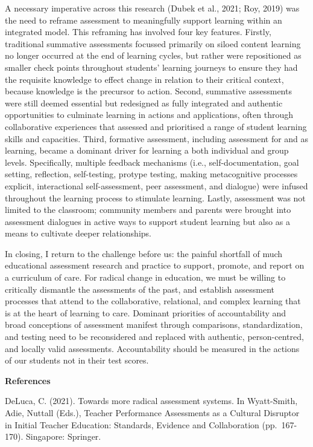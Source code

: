 \documentclass[
]{book}
\begin{document}
A necessary imperative across this research (Dubek et al., 2021; Roy, 2019) was the need to reframe assessment to meaningfully support learning within an integrated model. This reframing has involved four key features. Firstly, traditional summative assessments focussed primarily on siloed content learning no longer occurred at the end of learning cycles, but rather were repositioned as smaller check points throughout students' learning journeys to ensure they had the requisite knowledge to effect change in relation to their critical context, because knowledge is the precursor to action. Second, summative assessments were still deemed essential but redesigned as fully integrated and authentic opportunities to culminate learning in actions and applications, often through collaborative experiences that assessed and prioritised a range of student learning skills and capacities. Third, formative assessment, including assessment for and as learning, became a dominant driver for learning a both individual and group levels. Specifically, multiple feedback mechanisms (i.e., self-documentation, goal setting, reflection, self-testing, protype testing, making metacognitive processes explicit, interactional self-assessment, peer assessment, and dialogue) were infused throughout the learning process to stimulate learning. Lastly, assessment was not limited to the classroom; community members and parents were brought into assessment dialogues in active ways to support student learning but also as a means to cultivate deeper relationships.

In closing, I return to the challenge before us: the painful shortfall of much educational assessment research and practice to support, promote, and report on a curriculum of care. For radical change in education, we must be willing to critically dismantle the assessments of the past, and establish assessment processes that attend to the collaborative, relational, and complex learning that is at the heart of learning to care. Dominant priorities of accountability and broad conceptions of assessment manifest through comparisons, standardization, and testing need to be reconsidered and replaced with authentic, person-centred, and locally valid assessments. Accountability should be measured in the actions of our students not in their test scores. 

\textbf{References}

DeLuca, C. (2021). Towards more radical assessment systems. In Wyatt-Smith, Adie, Nuttall (Eds.), Teacher Performance Assessments as a Cultural Disruptor in Initial Teacher Education: Standards, Evidence and Collaboration (pp.~167-170). Singapore: Springer.
\end{document}
